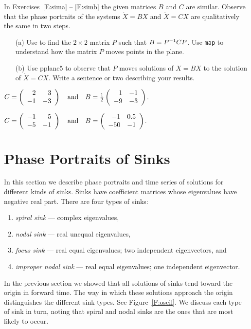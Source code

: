 \documentclass{ximera}
\begin{document}
\noindent In Exercises~\ref{E:sima} -- \ref{E:simb} the given matrices $B$
and $C$ are similar.  Observe that the phase portraits of the systems
$\dot{X}=BX$ and $\dot{X}=CX$ are qualitatively the same in two steps.
\begin{itemize}
\item[(a)]  Use \Matlab to find the $2\times 2$ matrix $P$ such that
$B=P^{-1} CP$.  Use {\tt map} to understand how the matrix $P$ moves points 
in the plane.
\item[(b)]  Use {\sf pplane5} to observe that $P$ moves solutions of
$\dot{X}=BX$ to the solution of $\dot{X}=CX$.  Write a sentence or two describing your results.
\end{itemize}
\begin{exercise} \label{E:sima}
$C = \left(\begin{array}{rr} 2 & 3\\ -1 &-3\end{array}\right) \quad\mbox{and}\quad B = \frac{1}{2}\left(\begin{array}{rr} 1 & -1\\ -9 &-3\end{array}\right)$.
\end{exercise}
\begin{exercise} \label{E:simb}
$C = \left(\begin{array}{rr} -1 & 5\\ -5 &-1\end{array}\right) \quad\mbox{and}\quad B = \left(\begin{array}{rr} -1 & 0.5\\ -50 &-1\end{array}\right)$.
\end{exercise}






\section{Phase Portraits of Sinks}  \label{S:PlanarSystems}

In this section we describe phase portraits and time series of
solutions for different kinds of sinks. Sinks have coefficient
matrices whose eigenvalues have negative real part.  There are
four types of sinks:
\begin{enumerate}
\item {\em spiral sink\/} --- complex eigenvalues,
\item {\em nodal sink\/} --- real unequal eigenvalues,
\item {\em focus sink\/} --- real equal eigenvalues; two independent
eigenvectors, and
\item {\em improper nodal sink\/} --- real equal eigenvalues; one independent
eigenvector.
\end{enumerate}
In the previous section we showed that all solutions of sinks tend toward
the origin in forward time.  The way in which these solutions approach the
origin distinguishes the different sink types.  See Figure~\ref{F:oscil}.
We discuss each type of sink in turn, noting that
spiral and nodal sinks are the ones that are most likely to occur.
\end{document}
